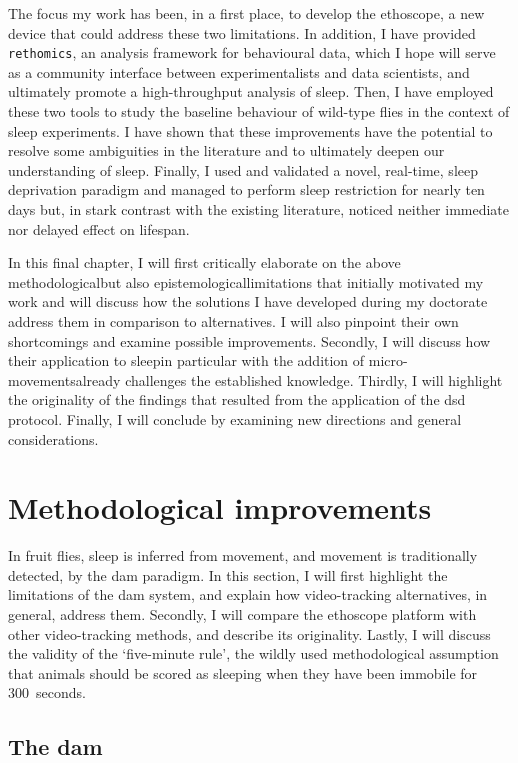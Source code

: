 The focus my work has been, in a first place, to develop the ethoscope, a new device that could address these two limitations. 
In addition, I have provided \texttt{rethomics}, an analysis framework for behavioural data, which I hope will serve as a community  interface between experimentalists and data scientists, and ultimately promote a high-throughput analysis of sleep.
Then, I have employed these two tools to study the baseline behaviour of wild-type flies in the context of sleep experiments.
I have shown that these improvements have the potential to resolve some ambiguities in the literature and to ultimately deepen our understanding of sleep.
Finally, I used and validated a novel, real-time, sleep deprivation paradigm and managed to perform sleep restriction for nearly ten days but, in stark contrast with the existing literature, noticed neither immediate nor delayed effect on lifespan.

In this final chapter, I will first critically elaborate on the above methodological\emd{}but also epistemological\emd{}limitations that initially motivated my work and will discuss how the solutions I have developed during my doctorate address them in comparison to alternatives.
I will also pinpoint their own shortcomings and examine possible improvements.
Secondly, I will discuss how their application to sleep\emd{}in particular with the addition of micro-movements\emd{}already challenges the established knowledge.
Thirdly, I will highlight the originality of the findings that resulted from the application of the \gls{dsd} protocol.
Finally, I will conclude by examining new directions and general considerations.

\newpage
\section{Methodological improvements}

In fruit flies, sleep is inferred from movement, and movement is traditionally detected, by the \gls{dam} paradigm.
In this section, I will first highlight the limitations of the \gls{dam} system, and explain how video-tracking alternatives, in general, address them.
Secondly, I will compare the ethoscope platform with other video-tracking methods, and describe its originality.
Lastly, I will discuss the validity of the `five-minute rule', the wildly used methodological assumption that animals should be scored as sleeping
when they have been immobile for 300~seconds.

\subsection{The \acrlong{dam}}

